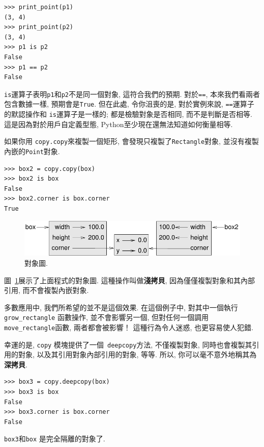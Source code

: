 \documentclass[10pt]{book}
\begin{document}
\begin{verbatim}
>>> print_point(p1)
(3, 4)
>>> print_point(p2)
(3, 4)
>>> p1 is p2
False
>>> p1 == p2
False
\end{verbatim}
%

{\tt is}運算子表明{\tt p1}和{\tt p2}不是同一個對象, 這符合我們的預期. 
對於{\tt ==}, 本來我們看兩者包含數據一樣, 預期會是{\tt True}. 
但在此處, 令你沮喪的是, 對於實例來說, {\tt ==}運算子的默認操作和
{\tt is}運算子是一樣的; 都是檢驗對象是否相同, 而不是判斷是否相等.
這是因為對於用戶自定義型態, Python至少現在還無法知道如何衡量相等.

如果你用 {\tt copy.copy}來複製一個矩形, 
會發現只複製了{\tt Rectangle}對象, 並沒有複製內嵌的{\tt Point}對象.

\begin{verbatim}
>>> box2 = copy.copy(box)
>>> box2 is box
False
>>> box2.corner is box.corner
True
\end{verbatim}

\begin{figure}
\centerline
{\includegraphics[scale=0.8]{figs/rectangle2.pdf}}
\caption{對象圖.}
\label{fig.rectangle2}
\end{figure}

圖~\ref{fig.rectangle2}展示了上面程式的對象圖.
這種操作叫做{\bf 淺拷貝}, 因為僅僅複製對象和其內部引用, 而不會複製內嵌對象. 

多數應用中, 我們所希望的並不是這個效果. 
在這個例子中, 對其中一個執行 \verb"grow_rectangle" 函數操作, 
並不會影響另一個, 但對任何一個調用 \verb"move_rectangle"函數, 兩者都會被影響！
這種行為令人迷惑, 也更容易使人犯錯. 

幸運的是,  {\tt copy} 模塊提供了一個{\tt
deepcopy}方法, 不僅複製對象, 同時也會複製其引用的對象, 
以及其引用對象內部引用的對象, 等等. 
所以, 你可以毫不意外地稱其為{\bf 深拷貝}. 

\begin{verbatim}
>>> box3 = copy.deepcopy(box)
>>> box3 is box
False
>>> box3.corner is box.corner
False
\end{verbatim}
%
{\tt box3}和{\tt box} 是完全隔離的對象了. 
\end{document}
